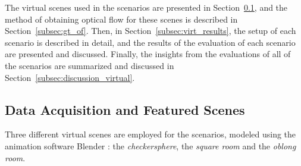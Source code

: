 

The virtual scenes used in the scenarios are presented in Section~\ref{subsec:data_acquisition}, and the method of obtaining optical flow for these scenes is described in Section~\ref{subsec:gt_of}. Then, in Section~\ref{subsec:virt_results}, the setup of each scenario is described in detail, and the results of the evaluation of each scenario are presented and discussed. Finally, the insights from the evaluations of all of the scenarios are summarized and discussed in Section~\ref{subsec:discussion_virtual}.


\subsection{Data Acquisition and Featured Scenes} \label{subsec:data_acquisition}


Three different virtual scenes are employed for the scenarios, modeled using the animation software Blender \cite{blender}: the \emph{checkersphere}, the \emph{square room} and the \emph{oblong room}.%

